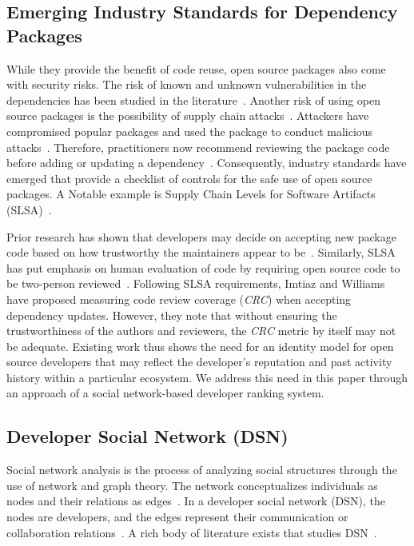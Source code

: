 \documentclass[10pt,journal,compsoc]{IEEEtran}
\begin{document}
\subsection{Emerging Industry Standards for Dependency Packages}
While they provide the benefit of code reuse, open source packages also come with security risks. The risk of known and unknown vulnerabilities in the dependencies has been studied in the literature~\cite{decan2018impact, lauinger2018thou, imtiaz2022open, imtiaz2021comparative}. 
Another risk of using open source packages is the possibility of supply chain attacks~\cite{ohm2020backstabber}. Attackers have compromised popular packages and used the package to conduct malicious attacks~\cite{ohm2020backstabber}. Therefore, practitioners now recommend reviewing the package code before adding or updating a dependency~\cite{imtiaz2022open,yang2021solarwinds}. Consequently, industry standards have emerged that provide a checklist of controls for the safe use of open source packages. A Notable example is Supply Chain Levels for Software Artifacts (SLSA)~\cite{slsa}.


Prior research has shown that developers may decide on accepting new package code based on how trustworthy the maintainers appear to be~\cite{zahan2022weak, wermke2022committed}. Similarly, SLSA has put emphasis on human evaluation of code by requiring open source code to be two-person reviewed~\cite{slsa}. 
Following SLSA requirements, Imtiaz and Williams ~\cite{imtiaz2022phantom} have proposed measuring code review coverage (\textit{CRC}) when accepting dependency updates. However, they note that without ensuring the trustworthiness of the authors and reviewers, the \textit{CRC} metric by itself may not be adequate. Existing work thus shows the need for an identity model for open source developers that may reflect the developer's reputation and past activity history within a particular ecosystem. We address this need in this paper through an approach of a social network-based developer ranking system.
    


\subsection{Developer Social Network (DSN)}
Social network analysis is the process of analyzing social structures through the use of network and graph theory. The network conceptualizes individuals as nodes and their relations as edges~\cite{scott2012social}. In a developer social network (DSN), the nodes are developers, and the edges represent their communication or collaboration relations~\cite{herbold2021systematic}. A rich body of literature exists that studies DSN~\cite{herbold2021systematic, schreiber2020social, bosu2014impact, meneely2011socio}.
\end{document}
